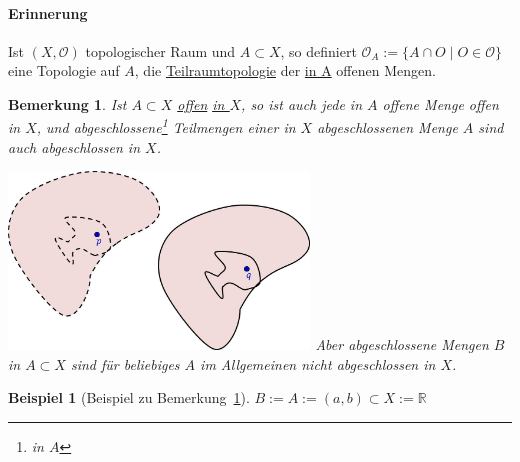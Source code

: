 \documentclass[a4paper,11pt,notitlepage]{report}
\newtheorem{remark}{Bemerkung}[chapter]
\newtheorem{example}{Beispiel}[chapter]
\newcommand{\R}{{\ensuremath{\mathbb{R}}}}
\newcommand{\OO}{{\ensuremath{\mathcal{O}}}}
\begin{document}
\paragraph{Erinnerung}
Ist $(X, \OO)$ topologischer Raum und $A \subset X$, so definiert
$\OO_A := \{ A \cap O \mid O \in \OO \}$ eine Topologie auf $A$, die
 \underline{Teilraumtopologie} der \underline{in A} offenen Mengen.
 
\begin{remark}
	\label{offenAbgeschlossen}
	Ist $A \subset X$ \underline{offen} \underline{\underline{in $X$}}, so ist auch jede in $A$ offene Menge offen in $X$, und abgeschlossene\footnote{in $A$} Teilmengen einer in $X$ abgeschlossenen Menge $A$ sind auch abgeschlossen in $X$.
		
	\includegraphics[width=0.6\textwidth]{images/offen_abgeschlossen.jpg}
	\newline
	Aber abgeschlossene Mengen $B$ in $A \subset X$ sind für beliebiges $A$ im Allgemeinen nicht abgeschlossen in $X$.
\end{remark}

\begin{example}[Beispiel zu Bemerkung~\ref{offenAbgeschlossen}]
	$B := A := (a,b) \subset X := \R$
\end{example}
\end{document}
